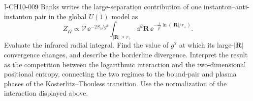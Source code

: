 \begin{exercise}{I-CH10-009}
Banks writes the large-separation contribution of one instanton--anti-instanton
pair in the global $U(1)$ model as
\[
  Z_{I\bar I}\mathrel{\propto}
  \mathcal V\,\ee^{-2S_0/g^2}
  \int_{|\mathbf R|\ge r_+}\dd^2\mathbf R\,
  \ee^{-\frac1{g^2}\ln(|\mathbf R|/r_+)}.
\]
Evaluate the infrared radial integral.  Find the value of $g^2$ at which its
large-$|\mathbf R|$ convergence changes, and describe the borderline divergence.
Interpret the result as the competition between the logarithmic interaction
and the two-dimensional positional entropy, connecting the two regimes to the
bound-pair and plasma phases of the Kosterlitz--Thouless transition.  Use the
normalization of the interaction displayed above.
\end{exercise}
